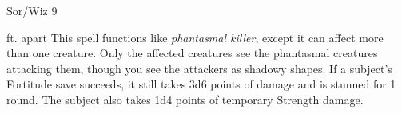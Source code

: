 
\begin{description*}
\item[Level:] Sor/Wiz 9
\end{description*}

ft. apart
This spell functions like \textit{phantasmal killer}, except it can affect more
than one creature. Only the affected creatures see the phantasmal creatures attacking
them, though you see the attackers as shadowy shapes.
If a subject's Fortitude save succeeds, it still takes 3d6 points of damage and
is stunned for 1 round. The subject also takes 1d4 points of temporary Strength
damage.